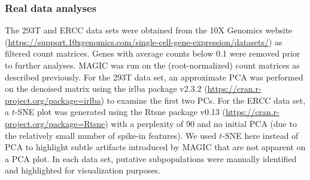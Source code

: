 \documentclass[10pt,letterpaper]{article}
\begin{document}
\subsubsection*{Real data analyses}
The 293T and ERCC data sets were obtained from the 10X Genomics website (\url{https://support.10xgenomics.com/single-cell-gene-expression/datasets/}) as filtered count matrices.
Genes with average counts below 0.1 were removed prior to further analyses.
MAGIC was run on the (root-normalized) count matrices as described previously.
For the 293T data set, an approximate PCA was performed on the denoised matrix using the irlba package v2.3.2 (\url{https://cran.r-project.org/package=irlba}) to examine the first two PCs.
For the ERCC data set, a $t$-SNE plot was generated using the Rtsne package v0.13 (\url{https://cran.r-project.org/package=Rtsne}) with a perplexity of 90 and no initial PCA
(due to the relatively small number of spike-in features).
We used $t$-SNE here instead of PCA to highlight subtle artifacts introduced by MAGIC that are not apparent on a PCA plot.
In each data set, putative subpopulations were manually identified and highlighted for visualization purposes.



\end{document}
